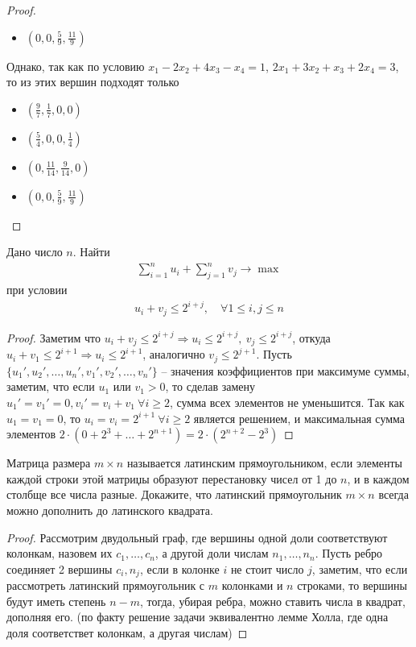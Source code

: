 \begin{proof}
\begin{itemize}
		\item $(0,0,\frac{5}{9},\frac{11}{9})$
	\end{itemize}
	Однако, так как по условию $x_{1} - 2x_{2} + 4x_{3} - x_{4} = 1$, $2x_{1} + 3x_{2} + x_{3} + 2x_{4} = 3$, то из этих вершин подходят только
	\begin{itemize}
		\item $(\frac{9}{7},\frac{1}{7},0,0)$
		\item $(\frac{5}{4},0,0,\frac{1}{4})$
		\item $(0,\frac{11}{14},\frac{9}{14},0)$
		\item $(0,0,\frac{5}{9},\frac{11}{9})$
	\end{itemize}
\end{proof}
\vskip 0.6in



\begin{prob}
Дано число $n$. Найти
\begin{gather*}
	\sum\limits_{i=1}^{n} u_i + \sum\limits_{j=1}^{n} v_j \to \max
\end{gather*}
при условии
\begin{gather*}
	u_i + v_j \leqslant 2^{i+j},\quad \forall 1 \leqslant i, j \leqslant n
\end{gather*}
\end{prob}
\begin{proof}
	Заметим что $u_i + v_j \leqslant 2^{i+j} \Rightarrow u_i \leqslant 2^{i+j},\ v_j \leqslant 2^{i+j}$, откуда $u_i + v_1 \leqslant 2^{i+1} \Rightarrow u_i \leqslant 2^{i+1}$, аналогично $v_j \leqslant 2^{j+1}$. Пусть $\{u_1', u_2', \ldots, u_n', v_1', v_2', \ldots, v_n'\}$ -- значения коэффициентов при максимуме суммы, заметим, что если $u_1$ или $v_1 > 0$, то сделав замену $u_1' = v_1' = 0, v_i' = v_i + v_1\ \forall i \geqslant 2$, сумма всех элементов не уменьшится. Так как $u_1 = v_1 = 0$, то $u_i = v_i = 2^{i+1}\ \forall i \geqslant 2$ является решением, и максимальная сумма элементов $2 \cdot (0 + 2^3 + \ldots + 2^{n+1}) = 2 \cdot (2^{n+2} - 2^{3})$
\end{proof}
\vskip 0.6in



\begin{prob}
Матрица размера $m \times n$ называется латинским прямоугольником, если элементы каждой строки этой матриџы образуют перестановку чисел от 1 до $n$, и в каждом столбще все числа разные.
\noindent
Докажите, что латинский прямоугольник $m \times n$ всегда можно дополнить до латинского квадрата.
\end{prob}
\begin{proof}
	Рассмотрим двудольный граф, где вершины одной доли соответствуют колонкам, назовем их $c_{1}, \ldots, c_{n}$, а другой доли числам $n_{1}, \ldots, n_{n}$. Пусть ребро соединяет 2 вершины $c_{i}, n_{j}$, если в колонке $i$ не стоит число $j$, заметим, что если рассмотреть латинский прямоугольник с $m$ колонками и $n$ строками, то вершины будут иметь степень $n-m$, тогда, убирая ребра, можно ставить числа в квадрат, дополняя его. (по факту решение задачи эквивалентно лемме Холла, где одна доля соответствет колонкам, а другая числам)
\end{proof}
\vskip 0.6in



